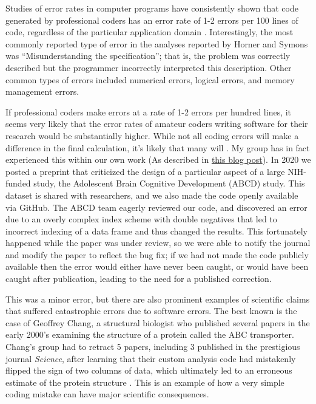 Studies of error rates in computer programs have consistently shown that code generated by professional coders has an error rate of 1-2 errors per 100 lines of code, regardless of the particular application domain \citep{Horner:2019aa}.
Interestingly, the most commonly reported type of error in the analyses reported by Horner and Symons was ``Misunderstanding the specification''; that is, the problem was correctly described but the programmer incorrectly interpreted this description.
Other common types of errors included numerical errors, logical errors, and memory management errors.

If professional coders make errors at a rate of 1-2 errors per hundred lines, it seems very likely that the error rates of amateur coders writing software for their research would be substantially higher.
While not all coding errors will make a difference in the final calculation, it's likely that many will \citep{Soergel:2014aa}.
My group has in fact experienced this within our own work (As described in \href{https://reproducibility.stanford.edu/coding-error-postmortem/}{this blog post}).
In 2020 we posted a preprint that criticized the design of a particular aspect of a large NIH-funded study, the Adolescent Brain Cognitive Development (ABCD) study.
This dataset is shared with researchers, and we also made the code openly available via GitHub.
The ABCD team eagerly reviewed our code, and discovered an error due to an overly complex index scheme with double negatives that led to incorrect indexing of a data frame and thus changed the results.
This fortunately happened while the paper was under review, so we were able to notify the journal and modify the paper to reflect the bug fix; if we had not made the code publicly available then the error would either have never been caught, or would have been caught after publication, leading to the need for a published correction.

This was a minor error, but there are also prominent examples of scientific claims that suffered catastrophic errors due to software errors.
The best known is the case of Geoffrey Chang, a structural biologist who published several papers in the early 2000's examining the structure of a protein called the ABC transporter.
Chang's group had to retract 5 papers, including 3 published in the prestigious journal \textit{Science}, after learning that their custom analysis code had mistakenly flipped the sign of two columns of data, which ultimately led to an erroneous estimate of the protein structure \citep{Miller:2006aa}.
This is an example of how a very simple coding mistake can have major scientific consequences.

